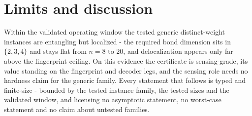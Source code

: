 \section{Limits and discussion}\label{sec:N7}

Within the validated operating window the tested generic distinct-weight instances are entangling but localized - the required bond dimension sits in $\{2, 3, 4\}$ and stays flat from $n = 8$ to $20$, and delocalization appears only far above the fingerprint ceiling. On this evidence the certificate is sensing-grade, its value standing on the fingerprint and decoder legs, and the sensing role needs no hardness claim for the generic family. Every statement that follows is typed and finite-size - bounded by the tested instance family, the tested sizes and the validated window, and licensing no asymptotic statement, no worst-case statement and no claim about untested families.

